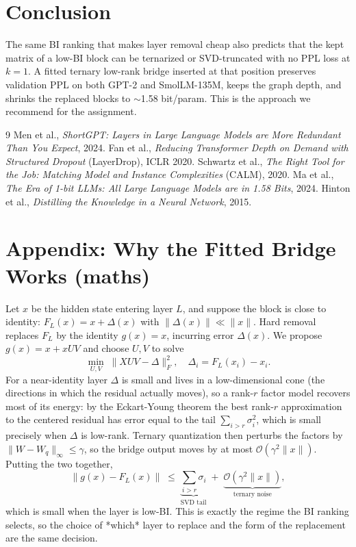 \documentclass[11pt]{article}
\begin{document}
\section{Conclusion}
The same BI ranking that makes layer removal cheap also predicts that the
kept matrix of a low-BI block can be ternarized or SVD-truncated with no
PPL loss at $k{=}1$. A fitted ternary low-rank bridge inserted at that
position preserves validation PPL on both GPT-2 and SmolLM-135M, keeps the
graph depth, and shrinks the replaced blocks to $\sim$1.58 bit/param. This
is the approach we recommend for the assignment.


\nocite{*}
\begin{thebibliography}{9}
Men et al., \emph{ShortGPT: Layers in Large Language Models are More
Redundant Than You Expect}, 2024.
Fan et al., \emph{Reducing Transformer Depth on Demand with Structured
Dropout} (LayerDrop), ICLR 2020.
Schwartz et al., \emph{The Right Tool for the Job: Matching Model and
Instance Complexities} (CALM), 2020.
Ma et al., \emph{The Era of 1-bit LLMs: All Large Language Models are in
1.58 Bits}, 2024.
Hinton et al., \emph{Distilling the Knowledge in a Neural Network}, 2015.
\end{thebibliography}

\section{Appendix: Why the Fitted Bridge Works (maths)}
Let $x$ be the hidden state entering layer $L$, and suppose the block is
close to identity: $F_L(x) = x + \Delta(x)$ with
$\|\Delta(x)\| \ll \|x\|$. Hard removal replaces $F_L$ by the identity
$g(x)=x$, incurring error $\Delta(x)$. We propose $g(x) = x + xUV$ and
choose $U,V$ to solve
\[
\min_{U,V} \; \bigl\| XUV - \Delta \bigr\|_F^2,
\quad \Delta_i = F_L(x_i) - x_i .
\]
For a near-identity layer $\Delta$ is small and lives in a low-dimensional
cone (the directions in which the residual actually moves), so a rank-$r$
factor model recovers most of its energy: by the Eckart-Young theorem the
best rank-$r$ approximation to the centered residual has error equal to the
tail $\sum_{i>r}\sigma_i^2$, which is small precisely when $\Delta$ is
low-rank. Ternary quantization then perturbs the factors by
$\|W - W_q\|_\infty \le \gamma$, so the bridge output moves by at most
$\mathcal{O}(\gamma^2 \|x\|)$. Putting the two together,
\[
\| g(x) - F_L(x) \| \;\le\; \underbrace{\sum_{i>r}\sigma_i}_{\text{SVD tail}}
\;+\; \underbrace{\mathcal{O}(\gamma^2 \|x\|)}_{\text{ternary noise}},
\]
which is small when the layer is low-BI. This is exactly the regime the
BI ranking selects, so the choice of *which* layer to replace and the form
of the replacement are the same decision.
\end{document}
